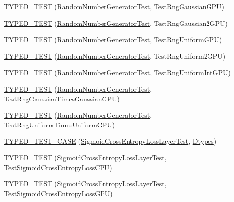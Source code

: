 \begin{DoxyCompactItemize}
\item 
\hyperlink{namespacecaffe_a02bc709f94e8d01e51dc13682e192f8a}{T\+Y\+P\+E\+D\+\_\+\+T\+E\+S\+T} (\hyperlink{classcaffe_1_1_random_number_generator_test}{Random\+Number\+Generator\+Test}, Test\+Rng\+Gaussian\+G\+P\+U)
\item 
\hyperlink{namespacecaffe_a9f6f159cf788fba69529ef1fcd435c66}{T\+Y\+P\+E\+D\+\_\+\+T\+E\+S\+T} (\hyperlink{classcaffe_1_1_random_number_generator_test}{Random\+Number\+Generator\+Test}, Test\+Rng\+Gaussian2\+G\+P\+U)
\item 
\hyperlink{namespacecaffe_a2220590a22a84d2565d28f56d54b4b84}{T\+Y\+P\+E\+D\+\_\+\+T\+E\+S\+T} (\hyperlink{classcaffe_1_1_random_number_generator_test}{Random\+Number\+Generator\+Test}, Test\+Rng\+Uniform\+G\+P\+U)
\item 
\hyperlink{namespacecaffe_a8e3d3ed214f3feb876c187fffe3490a1}{T\+Y\+P\+E\+D\+\_\+\+T\+E\+S\+T} (\hyperlink{classcaffe_1_1_random_number_generator_test}{Random\+Number\+Generator\+Test}, Test\+Rng\+Uniform2\+G\+P\+U)
\item 
\hyperlink{namespacecaffe_abacbd04f25d2b779004ab46aade1df5b}{T\+Y\+P\+E\+D\+\_\+\+T\+E\+S\+T} (\hyperlink{classcaffe_1_1_random_number_generator_test}{Random\+Number\+Generator\+Test}, Test\+Rng\+Uniform\+Int\+G\+P\+U)
\item 
\hyperlink{namespacecaffe_a16863d237a8ace81d249bf1554e1c586}{T\+Y\+P\+E\+D\+\_\+\+T\+E\+S\+T} (\hyperlink{classcaffe_1_1_random_number_generator_test}{Random\+Number\+Generator\+Test}, Test\+Rng\+Gaussian\+Times\+Gaussian\+G\+P\+U)
\item 
\hyperlink{namespacecaffe_a59dc3ed12ecc3b1967f4da4714073710}{T\+Y\+P\+E\+D\+\_\+\+T\+E\+S\+T} (\hyperlink{classcaffe_1_1_random_number_generator_test}{Random\+Number\+Generator\+Test}, Test\+Rng\+Uniform\+Times\+Uniform\+G\+P\+U)
\item 
\hyperlink{namespacecaffe_a742494379b23b84ca2c975849bbd1273}{T\+Y\+P\+E\+D\+\_\+\+T\+E\+S\+T\+\_\+\+C\+A\+S\+E} (\hyperlink{classcaffe_1_1_sigmoid_cross_entropy_loss_layer_test}{Sigmoid\+Cross\+Entropy\+Loss\+Layer\+Test}, \hyperlink{namespacecaffe_a131dc2be50f2f10e18450da61cde6b57}{Dtypes})
\item 
\hyperlink{namespacecaffe_abce4168da88b079bb7c6bc44e9e51fc4}{T\+Y\+P\+E\+D\+\_\+\+T\+E\+S\+T} (\hyperlink{classcaffe_1_1_sigmoid_cross_entropy_loss_layer_test}{Sigmoid\+Cross\+Entropy\+Loss\+Layer\+Test}, Test\+Sigmoid\+Cross\+Entropy\+Loss\+C\+P\+U)
\item 
\hyperlink{namespacecaffe_a44fa9035c089de8f02b52a43b1a84704}{T\+Y\+P\+E\+D\+\_\+\+T\+E\+S\+T} (\hyperlink{classcaffe_1_1_sigmoid_cross_entropy_loss_layer_test}{Sigmoid\+Cross\+Entropy\+Loss\+Layer\+Test}, Test\+Sigmoid\+Cross\+Entropy\+Loss\+G\+P\+U)

\end{DoxyCompactItemize}
